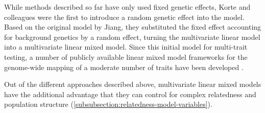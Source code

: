 While methods described so far have only used fixed genetic effects, Korte and colleagues \parencite*{Korte2012} were the first to introduce a random genetic effect into the model. Based on the original model by Jiang, they substituted the fixed effect accounting for background genetics by a random effect, turning the multivariate linear model into a multivariate linear mixed model. Since this initial model for multi-trait testing, a number of publicly available linear mixed model frameworks for the genome-wide mapping of a moderate number of traits have been developed \citep{Yang2014,Lippert2014,Zhou2014,Casale2015}. 

Out of the different approaches described above, multivariate linear mixed models have the additional advantage that they can control for complex relatedness and population structure (\cref{subsubsection:relatedness-model-variables}). 

